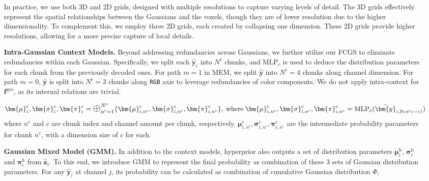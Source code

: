 \documentclass{article} %
\newcommand{\midoplus}{\mathlarger{\mathlarger{\oplus}}}
\begin{document}
In practice, we use both 3D and 2D grids, designed with multiple resolutions to capture varying levels of detail. The 3D grids effectively represent the spatial relationships between the Gaussians and the voxels, though they are of lower resolution due to the higher dimensionality. To complement this, we employ three 2D grids, each created by collapsing one dimension. These 2D grids provide higher resolutions, allowing for a more precise capture of local details.

\textbf{Intra-Gaussian Context Models.} Beyond addressing redundancies across Gaussians, we further utilize our FCGS to eliminate redundancies within each Gaussian. Specifically, we split each $\hat{\bm{y}}_i$ into $N^\text{c}$ chunks, and $\text{MLP}_\text{c}$ is used to deduce the distribution parameters for each chunk from the previously decoded ones. For path $m=1$ in MEM, we split $\hat{\bm{y}}$ into $N^\text{c}=4$ chunks along channel dimension. For path $m=0$, $\hat{\bm{y}}$ is split into $N^\text{c}=3$ chunks along \texttt{RGB} axis to leverage redundancies of color components. We do not apply intra-context for $\bm{f}^{\text{geo}}$, as its internal relations are trivial.

\vspace{-10pt}
\begin{equation}
    \bm{\mu}^\text{c}_i, \bm{\sigma}^\text{c}_i, \bm{\pi}^\text{c}_i = \midoplus_{n^\text{c}=1}^{N^c}\{\bm{\mu}^\text{c}_{i, n^\text{c}}, \bm{\sigma}^\text{c}_{i, n^\text{c}}, \bm{\pi}^\text{c}_{i, n^\text{c}}\},\; \text{where}\;
    \bm{\mu}^\text{c}_{i, n^\text{c}}, \bm{\sigma}^\text{c}_{i, n^\text{c}}, \bm{\pi}^\text{c}_{i, n^\text{c}} = \text{MLP}_\text{c}(\hat{\bm{y}}_{i, [0,n^\text{c}c-c)})
\end{equation}
where $n^\text{c}$ and $c$ are chunk index and channel amount per chunk, respectively. $\bm{\mu}^\text{c}_{i, n^\text{c}}, \bm{\sigma}^\text{c}_{i, n^\text{c}}, \bm{\pi}^\text{c}_{i, n^\text{c}}$ are the intermediate probability parameters for chunk $n^\text{c}$, with a dimension size of $c$ for each.


\textbf{Gaussian Mixed Model (GMM).} In addition to the context models, hyperprior also outputs a set of distribution parameters $\bm{\mu}^\text{h}_i$, $\bm{\sigma}^\text{h}_i$ and $\bm{\pi}^\text{h}_i$ from $\hat{\bm{z}}_i$. To this end, we introduce GMM to represent the final probability as combination of these $3$ sets of Gaussian distribution parameters. For any $\hat{\bm{y}}_i$ at channel $j$, its probability can be calculated as combination of cumulative Gaussian distribution $\Phi$,
\end{document}
